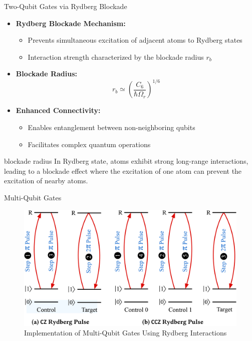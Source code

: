 \begin{frame}{Two-Qubit Gates via Rydberg Blockade}
    \begin{itemize}
        \item \textbf{Rydberg Blockade Mechanism:}
        \begin{itemize}
            \item Prevents simultaneous excitation of adjacent atoms to Rydberg states
            \item Interaction strength characterized by the blockade radius \( r_b \)
        \end{itemize}
        \item \textbf{Blockade Radius:}
        \[
            r_b \simeq \left( \frac{C_6}{\hbar \Omega_r} \right)^{1/6}
        \]
        \item \textbf{Enhanced Connectivity:}
        \begin{itemize}
            \item Enables entanglement between non-neighboring qubits
            \item Facilitates complex quantum operations
        \end{itemize}
    \end{itemize}
\end{frame}
\begin{frame}{blockade radius}
    In Rydberg state, atoms exhibit strong long-range interactions, leading to a blockade effect where the excitation of one atom can prevent the excitation of nearby atoms.

    
    \centering
    \scalebox{0.8}{}
    \scalebox{0.8}{}
\end{frame}
\begin{frame}{Multi-Qubit Gates}
    \begin{figure}
        \centering
        \includegraphics[width=0.8\linewidth]{images/multi-gate.png}
        \caption{Implementation of Multi-Qubit Gates Using Rydberg Interactions}
    \end{figure}
\end{frame}

